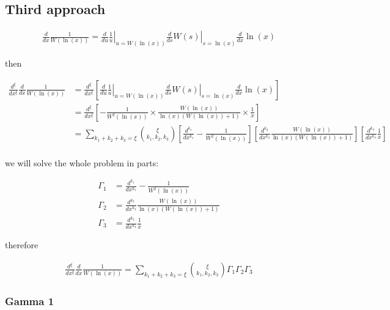 \section{}

\subsection{Third approach}

\begin{align}
      \frac{d}{dx}\frac{1}{W(\ln(x))} = \left.\frac{d}{du}\frac{1}{u}\right|_{u 
      = W(\ln(x))}\left.\frac{d}{ds}W(s)\right|_{s = \ln(x)}\frac{d}{dx}\ln(x)
\end{align}

then

\begin{align}
      \frac{d^\xi}{dx^\xi}\frac{d}{dx}\frac{1}{W(\ln(x))} &=
      \frac{d^\xi}{dx^\xi}\left[\left.\frac{d}{du}\frac{1}{u}\right|_{u 
      = W(\ln(x))}\left.\frac{d}{ds}W(s)\right|_{s = \ln(x)}\frac{d}{dx}
       \ln(x)\right] \\ & = \frac{d^\xi}{dx^\xi}\left[-\frac{1}{W^2(\ln(x))}
      \times \frac{W(\ln(x))}{\ln(x)(W(\ln(x))+1)}\times \frac{1}{x}\right] \\
      &=\sum_{k_1+k_2+k_3=\xi}\binom{\xi}{k_1, k_2, k_3} \left[\frac{d^{k_1}}{dx^{k_1}}
      -\frac{1}{W^2(\ln(x))}\right]\left[\frac{d^{k_2}}{dx^{k_2}}\frac{W(\ln(x))}{\ln(x)
      (W(\ln(x))+1)}\right]\left[\frac{d^{k_3}}{dx^{k_3}}\frac{1}{x}\right] \\
\end{align}

we will solve the whole problem in parts:

\begin{align}
      \Gamma_1 &= \frac{d^{k_1}}{dx^{k_1}}-\frac{1}{W^2(\ln(x))} \\
      \Gamma_2 &= \frac{d^{k_2}}{dx^{k_2}}\frac{W(\ln(x))}{\ln(x)(W(\ln(x))+1)} \\
      \Gamma_3 &= \frac{d^{k_3}}{dx^{k_3}}\frac{1}{x}
\end{align}

therefore

\begin{align}
      \frac{d^\xi}{dx^\xi}\frac{d}{dx}\frac{1}{W(\ln(x))}=
      \sum_{k_1+k_2+k_3=\xi}\binom{\xi}{k_1, k_2, k_3} \Gamma_1 \Gamma_2 \Gamma_3
\end{align}

\subsubsection{Gamma 1}

